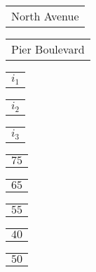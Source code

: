 \documentclass{book}
\begin{document}
\stopmpxshipout
\mpxshipout%
{\small \renewcommand{\arraystretch}{.9}
              \circuitfont\begin{tabular}{@{}l@{}}
                  North Avenue   
              \end{tabular}}%
\stopmpxshipout
\mpxshipout%
{\small \renewcommand{\arraystretch}{.9}
              \circuitfont\begin{tabular}{@{}l@{}}
                  Pier Boulevard   
              \end{tabular}}%
\stopmpxshipout
\mpxshipout%
{\small \renewcommand{\arraystretch}{.9}
              \circuitfont\begin{tabular}{@{}c@{}}
                  $i_1$
              \end{tabular}}%
\stopmpxshipout
\mpxshipout%
{\small \renewcommand{\arraystretch}{.9}
              \circuitfont\begin{tabular}{@{}r@{}}
                  $i_2$
              \end{tabular}}%
\stopmpxshipout
\mpxshipout%
{\small \renewcommand{\arraystretch}{.9}
              \circuitfont\begin{tabular}{@{}l@{}}
                  $i_3$
              \end{tabular}}%
\stopmpxshipout
\mpxshipout%
{\tiny \renewcommand{\arraystretch}{.9}
              \circuitfont\begin{tabular}{@{}r@{}}
                  $75$     
              \end{tabular}}%
\stopmpxshipout
\mpxshipout%
{\tiny \renewcommand{\arraystretch}{.9}
              \circuitfont\begin{tabular}{@{}c@{}}
                  $65$     
              \end{tabular}}%
\stopmpxshipout
\mpxshipout%
{\tiny \renewcommand{\arraystretch}{.9}
              \circuitfont\begin{tabular}{@{}c@{}}
                  $55$     
              \end{tabular}}%
\stopmpxshipout
\mpxshipout%
{\tiny \renewcommand{\arraystretch}{.9}
              \circuitfont\begin{tabular}{@{}l@{}}
                  $40$     
              \end{tabular}}%
\stopmpxshipout
\mpxshipout%
{\tiny \renewcommand{\arraystretch}{.9}
              \circuitfont\begin{tabular}{@{}l@{}}
                  $50$     
              \end{tabular}}%
\end{document}
